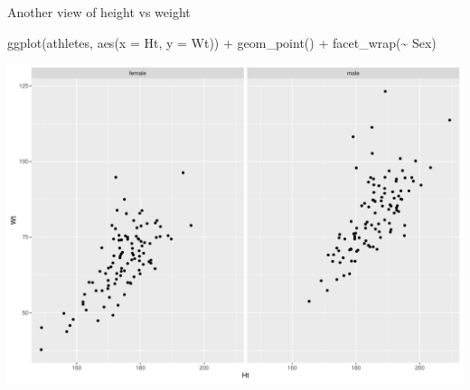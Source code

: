 \documentclass[
  ignorenonframetext,
]{beamer}
\newenvironment{Shaded}{\begin{snugshade}}{\end{snugshade}}
\newcommand{\AttributeTok}[1]{\textcolor[rgb]{0.40,0.45,0.13}{#1}}
\newcommand{\FunctionTok}[1]{\textcolor[rgb]{0.28,0.35,0.67}{#1}}
\newcommand{\NormalTok}[1]{\textcolor[rgb]{0.00,0.23,0.31}{#1}}
\newcommand{\SpecialCharTok}[1]{\textcolor[rgb]{0.37,0.37,0.37}{#1}}
\begin{document}
\begin{frame}[fragile]{Another view of height vs weight}
\label{another-view-of-height-vs-weight}
\begin{Shaded}
\begin{Highlighting}[]
\FunctionTok{ggplot}\NormalTok{(athletes, }\FunctionTok{aes}\NormalTok{(}\AttributeTok{x =}\NormalTok{ Ht, }\AttributeTok{y =}\NormalTok{ Wt)) }\SpecialCharTok{+}
  \FunctionTok{geom\_point}\NormalTok{() }\SpecialCharTok{+} \FunctionTok{facet\_wrap}\NormalTok{(}\SpecialCharTok{\textasciitilde{}}\NormalTok{ Sex)}
\end{Highlighting}
\end{Shaded}

\includegraphics{graphs_files/figure-beamer/unnamed-chunk-3-1.pdf}
\end{frame}
\end{document}
